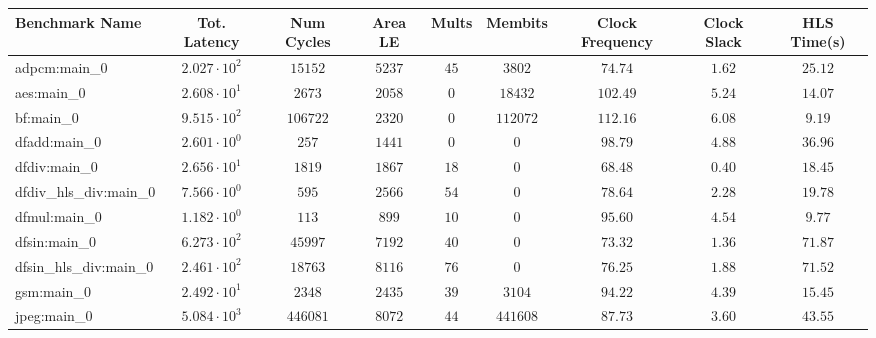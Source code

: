 \begin{tabular}{|l|c|c|c|c|c|c|c|c|}
\hline
Benchmark Name          & Tot. Latency           & Num Cycles & Area LE   & Mults   & Membits    & Clock Frequency & Clock Slack & HLS Time(s) \\
\hline
adpcm:main\_0           & $ 2.027 \cdot 10^{2} $ & $ 15152  $ & $ 5237  $ & $ 45  $ & $ 3802   $ & $ 74.74       $ & $ 1.62    $ & $ 25.12   $ \\
aes:main\_0             & $ 2.608 \cdot 10^{1} $ & $ 2673   $ & $ 2058  $ & $ 0   $ & $ 18432  $ & $ 102.49      $ & $ 5.24    $ & $ 14.07   $ \\
bf:main\_0              & $ 9.515 \cdot 10^{2} $ & $ 106722 $ & $ 2320  $ & $ 0   $ & $ 112072 $ & $ 112.16      $ & $ 6.08    $ & $ 9.19    $ \\
dfadd:main\_0           & $ 2.601 \cdot 10^{0} $ & $ 257    $ & $ 1441  $ & $ 0   $ & $ 0      $ & $ 98.79       $ & $ 4.88    $ & $ 36.96   $ \\
dfdiv:main\_0           & $ 2.656 \cdot 10^{1} $ & $ 1819   $ & $ 1867  $ & $ 18  $ & $ 0      $ & $ 68.48       $ & $ 0.40    $ & $ 18.45   $ \\
dfdiv\_hls\_div:main\_0 & $ 7.566 \cdot 10^{0} $ & $ 595    $ & $ 2566  $ & $ 54  $ & $ 0      $ & $ 78.64       $ & $ 2.28    $ & $ 19.78   $ \\
dfmul:main\_0           & $ 1.182 \cdot 10^{0} $ & $ 113    $ & $ 899   $ & $ 10  $ & $ 0      $ & $ 95.60       $ & $ 4.54    $ & $ 9.77    $ \\
dfsin:main\_0           & $ 6.273 \cdot 10^{2} $ & $ 45997  $ & $ 7192  $ & $ 40  $ & $ 0      $ & $ 73.32       $ & $ 1.36    $ & $ 71.87   $ \\
dfsin\_hls\_div:main\_0 & $ 2.461 \cdot 10^{2} $ & $ 18763  $ & $ 8116  $ & $ 76  $ & $ 0      $ & $ 76.25       $ & $ 1.88    $ & $ 71.52   $ \\
gsm:main\_0             & $ 2.492 \cdot 10^{1} $ & $ 2348   $ & $ 2435  $ & $ 39  $ & $ 3104   $ & $ 94.22       $ & $ 4.39    $ & $ 15.45   $ \\
jpeg:main\_0            & $ 5.084 \cdot 10^{3} $ & $ 446081 $ & $ 8072  $ & $ 44  $ & $ 441608 $ & $ 87.73       $ & $ 3.60    $ & $ 43.55   $ \\

\end{tabular}

